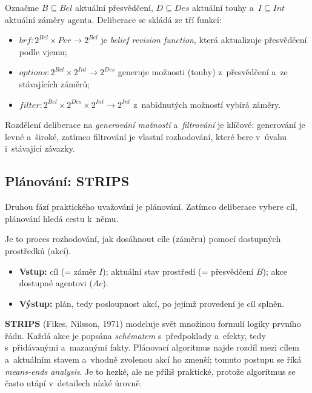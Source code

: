 \documentclass[11pt,a4paper]{article}
\theoremstyle{definition}
\begin{document}
\begin{defbox}
Označme $B \subseteq \mathit{Bel}$ aktuální přesvědčení, $D \subseteq \mathit{Des}$ aktuální touhy
a~$I \subseteq \mathit{Int}$ aktuální záměry agenta. Deliberace se skládá ze tří funkcí:
\begin{itemize}
\item $\mathit{brf} : 2^{\mathit{Bel}} \times \mathit{Per} \to 2^{\mathit{Bel}}$ je
  \emph{belief revision function}, která aktualizuje přesvědčení podle vjemu;
\item $\mathit{options} : 2^{\mathit{Bel}} \times 2^{\mathit{Int}} \to 2^{\mathit{Des}}$
  generuje možnosti (touhy) z~přesvědčení a~ze stávajících záměrů;
\item $\mathit{filter} : 2^{\mathit{Bel}} \times 2^{\mathit{Des}} \times 2^{\mathit{Int}}
  \to 2^{\mathit{Int}}$ z~nabídnutých možností vybírá záměry.
\end{itemize}
Rozdělení deliberace na \emph{generování možností} a~\emph{filtrování} je klíčové: generování
je levné a~široké, zatímco filtrování je vlastní rozhodování, které bere v~úvahu i~stávající
závazky.
\end{defbox}

\subsection{Plánování: STRIPS}

Druhou fází praktického uvažování je plánování. Zatímco deliberace vybere cíl, plánování hledá
cestu k~němu.

\begin{defbox}
Je to proces rozhodování, jak dosáhnout cíle (záměru) pomocí dostupných prostředků (akcí).
\begin{itemize}
\item \textbf{Vstup:} cíl (= záměr $I$); aktuální stav prostředí (= přesvědčení $B$);
  akce dostupné agentovi ($\mathit{Ac}$).
\item \textbf{Výstup:} plán, tedy posloupnost akcí, po jejímž provedení je cíl splněn.
\end{itemize}
\end{defbox}

\textbf{STRIPS} (Fikes, Nilsson, 1971) modeluje svět množinou formulí logiky prvního řádu.
Každá akce je popsána \emph{schématem} s~předpoklady a~efekty, tedy s~přidávanými a~mazanými
fakty. Plánovací algoritmus najde rozdíl mezi cílem a~aktuálním stavem a~vhodně zvolenou akcí
ho zmenší; tomuto postupu se říká \emph{means-ends analysis}. Je to hezké, ale ne příliš
praktické, protože algoritmus se často utápí v~detailech nízké úrovně.
\end{document}
